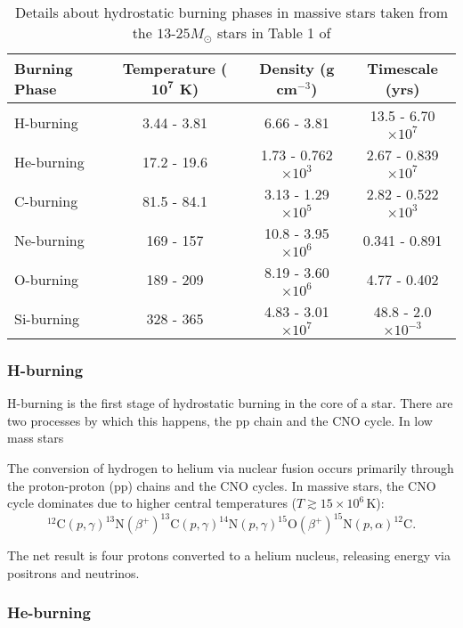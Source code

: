\begin{table}[H]
\caption{Details about hydrostatic burning phases in massive stars taken from the $13\text{-}25 M_\odot$ stars in Table 1 of \cite{woosleyEvolutionExplosionMassive2002}}
\begin{tabular}{|l|c|c|c|}
    \hline
    \textbf{Burning Phase} & \textbf{Temperature ($\mathbf{10^7}$ K)} & \textbf{Density (g cm$^{-3}$)} & \textbf{Timescale (yrs)} 
    \\ \hline
    H-burning & 3.44 - 3.81 & 6.66 - 3.81 & 13.5 - 6.70 $\times 10^7$ \\ \hline
    He-burning & 17.2 - 19.6 & 1.73 - 0.762 $\times 10^3$  & 2.67 - 0.839 $\times 10^7$ \\ \hline
    C-burning & 81.5 - 84.1 & 3.13 - 1.29 $\times 10^5$ & 2.82 - 0.522 $\times 10^3$ \\ \hline
    Ne-burning & 169 - 157  & 10.8 - 3.95 $\times 10^6$ & 0.341 - 0.891 \\ \hline
    O-burning & 189 - 209  & 8.19 - 3.60 $\times 10^6$ & 4.77 - 0.402 \\ \hline
    Si-burning &  328 - 365 & 4.83 - 3.01 $\times 10^7$ & 48.8 - 2.0 $\times 10^{-3}$\\
    \hline
\end{tabular}
\end{table}

\subsubsection{H-burning}

H-burning is the first stage of hydrostatic burning in the core of a star. 
There are two processes by which this happens, the pp chain and the CNO cycle.
In low mass stars

The conversion of hydrogen to helium via nuclear fusion occurs primarily through the proton-proton (pp) chains and the CNO cycles. In massive stars, the CNO cycle dominates due to higher central temperatures (\( T \gtrsim 15 \times 10^6\,\mathrm{K} \)):
\begin{equation}
^{12}\mathrm{C}(p,\gamma)^{13}\mathrm{N}(\beta^+)^{13}\mathrm{C}(p,\gamma)^{14}\mathrm{N}(p,\gamma)^{15}\mathrm{O}(\beta^+)^{15}\mathrm{N}(p,\alpha)^{12}\mathrm{C}.
\end{equation}

The net result is four protons converted to a helium nucleus, releasing energy via positrons and neutrinos.

\subsubsection{He-burning}

